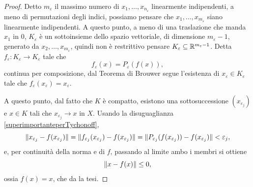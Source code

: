\begin{proof}
	Detto $m_\varepsilon$ il massimo numero di $x_1,\dots,x_{n_\varepsilon}$ linearmente indipendenti, a meno di permutazioni degli indici, possiamo pensare che $x_1,\dots, x_{m_\varepsilon}$ siano linearmente indipendenti. A questo punto, a meno di una traslazione che manda $x_1$ in $0$, $K_\varepsilon$ è un sottoinsieme dello spazio vettoriale, di dimensione $m_\varepsilon-1$, generato da $x_2,\dots,x_{m_\varepsilon}$, quindi non è restrittivo pensare $K_\varepsilon \subseteq \mathbb{R}^{m_\varepsilon-1}$. Detta $f_\varepsilon: K_\varepsilon \to K_\varepsilon$ tale che
	\[ f_\varepsilon(x) = P_\varepsilon(f(x)), \]
	continua per composizione, dal Teorema di Brouwer segue l'esistenza di $x_\varepsilon \in K_\varepsilon$ tale che $f_\varepsilon(x_\varepsilon) = x_\varepsilon$.
	
	A questo punto, dal fatto che $K$ è compatto, esistono una sottosuccessione $(x_{\varepsilon_j})$ e $x \in K$ tali che $x_{\varepsilon_j} \to x$ in $X$. Usando la disuguaglianza \eqref{superimportanteperTychonoff},
	\[ \lVert x_{\varepsilon_j}- f(x_{\varepsilon_j})\rVert =  \lVert f_{\varepsilon_j}(x_{\varepsilon_j})- f(x_{\varepsilon_j})\rVert = \lVert P_{\varepsilon_j}(f(x_{\varepsilon_j})) -f(x_{\varepsilon_j})\rVert < \varepsilon_j,\]
	e, per continuità della norma e di $f$, passando al limite ambo i membri si ottiene 
	\[ \lVert x - f(x)\rVert\le 0, \]
	ossia $f(x) = x$, che da la tesi.
\end{proof}
